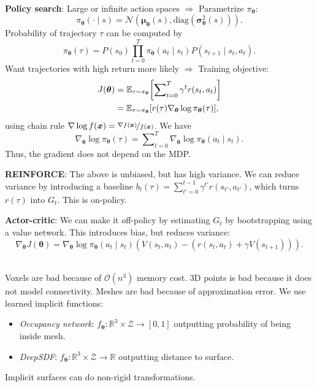 \documentclass{article}
\newcommand{\lft}{\mathopen{}\mathclose\bgroup\left}
\newcommand{\rgt}{\aftergroup\egroup\right}
\newcommand{\E}{\mathbb{E}}
\newcommand{\R}{\mathbb{R}}
\renewcommand{\vec}[1]{\bm{#1}}
\newenvironment{topic}[1]
{\textbf{\sffamily \colorbox{black}{\rlap{\textbf{\textcolor{white}{#1}}}\hspace{\linewidth}\hspace{-2\fboxsep}}} \\ \vspace{0.2cm}}
{}
\begin{document}
\begin{multicols*}{2}
\begin{topic}{Reinforcement learning}
        \textbf{Policy search}: Large or infinite action spaces $\Rightarrow$ Parametrize
        $\pi_{\vec{\theta}}$: \[
            \pi_{\vec{\theta}}(\cdot \mid s) = \mathcal{N}(\vec{\mu}_{\vec{\theta}}(s), \mathrm{diag}(\vec{\sigma}_{\vec{\theta}}^2(s))).
        \]
        Probability of trajectory $\tau$ can be computed by \[
            \pi_{\vec{\theta}}(\tau) = P(s_0) \prod_{t=0}^T \pi_{\vec{\theta}}(a_t \mid s_t) P(s_{t+1} \mid s_t, a_t).
        \]
        Want trajectories with high return more likely $\Rightarrow$ Training objective:
        \begin{align*}
            J(\vec{\theta}) & = \E_{\tau \sim \pi_{\vec{\theta}}} \lft[ \sum\nolimits_{t=0}^{T} \gamma^t r(s_t, a_t) \rgt]         \\
                            & = \E_{\tau \sim \pi_{\vec{\theta}}} [ r(\tau) \nabla_{\vec{\theta}} \log \pi_{\vec{\theta}}(\tau) ],
        \end{align*}
        using chain rule $\nabla \log f(\vec{x}) = \nicefrac{\nabla f(\vec{x})}{f(\vec{x})}$. We have \[
            \nabla_{\vec{\theta}} \log \pi_{\vec{\theta}}(\tau) = \sum\nolimits_{t=0}^{T} \nabla_{\vec{\theta}} \log \pi_{\vec{\theta}}(a_t \mid s_t).
        \]
        Thus, the gradient does not depend on the MDP.

        \textbf{REINFORCE}: The above is unbiased, but has high variance. We can reduce variance by
        introducing a baseline $b_t(\tau) = \sum_{t'=0}^{t-1} \gamma^{t'} r(s_{t'}, a_{t'})$, which
        turns $r(\tau)$ into $G_t$. This is on-policy.

        \textbf{Actor-critic}: We can make it off-policy by estimating $G_t$ by bootstrapping using a value network. This introduces bias, but reduces variance: \[
            \nabla_{\vec{\theta}} J(\vec{\theta}) = \nabla_{\vec{\theta}} \log \pi_{\vec{\theta}} (a_t \mid s_t) (V(s_t, a_t) - (r(s_t, a_t) + \gamma V(s_{t+1}))).
        \]

    \end{topic}

    \begin{topic}{Implicit surfaces and neural radiance fields}
        Voxels are bad because of $\mathcal{O}(n^3)$ memory cost. 3D points is bad because it does not
        model connectivity. Meshes are bad because of approximation error. We use learned implicit
        functions:
        \begin{itemize}
            \item \textit{Occupancy network}: $f_{\vec{\theta}}: \R^3 \times \mathcal{Z} \to [0,1]$ outputting probability of
                  being inside mesh.
            \item \textit{DeepSDF}: $f_{\vec{\theta}}: \R^3 \times \mathcal{Z} \to \R$ outputting distance to surface.
        \end{itemize}
        Implicit surfaces can do non-rigid transformations.


\end{topic}
\end{multicols*}
\end{document}
